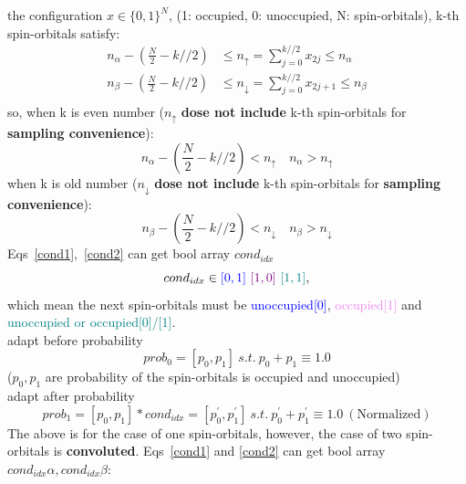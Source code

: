 the configuration $x \in \{0, 1\}^{N}$, (1: occupied, 0: unoccupied, N: spin-orbitals),
k-th spin-orbitals satisfy:
\begin{equation}
    \begin{split}
        n_{\alpha} - \left(\frac{N}{2} - k//2\right) &
            \leq n_{\uparrow} = \sum_{j=0}^{k//2}x_{2j} \leq n_{\alpha} \\
        n_{\beta} - \left(\frac{N}{2} - k//2\right) &
            \leq n_{\downarrow} = \sum_{j=0}^{k//2}x_{2j+1} \leq n_{\beta} \\
    \end{split}
\end{equation}
so, when k is even number ($n_{\uparrow}$ \textbf{dose not include} k-th spin-orbitals for \textbf{sampling convenience}):
\begin{equation}
    n_{\alpha} - \left(\frac{N}{2} - k//2\right) < n_{\uparrow} \quad n_{\alpha} > n_{\uparrow} \label{cond1}
\end{equation}
when k is old number  ($n_{\downarrow}$ \textbf{dose not include} k-th spin-orbitals for \textbf{sampling convenience}):
\begin{equation}
    n_{\beta} - \left(\frac{N}{2} - k//2\right) < n_{\downarrow} \quad n_{\beta} > n_{\downarrow} \label{cond2}
\end{equation}
Eqs\ \ref{cond1},\ \ref{cond2} can get bool array $cond_{idx}$
\begin{equation}
 cond_{idx} \in \textcolor{blue}{[0, 1]} \ \textcolor{violet}{[1, 0]}\ \textcolor{teal}{[1, 1]},
\end{equation}
which mean the next spin-orbitals must be \textcolor{blue}{unoccupied[0]},
\textcolor{violet}{occupied[1]} and \textcolor{teal}{unoccupied or occupied[0]/[1]}.\\
adapt before probability 
\begin{equation}
    prob_0 = [p_0, p_1] \ s.t.\ p_0 + p_1 \equiv 1.0
\end{equation}
($p_0, p_1$ are probability of the spin-orbitals is occupied and unoccupied)\\
adapt after probability
\begin{equation}
prob_1 =[p_0, p_1] * cond_{idx} = [p_0^{\prime}, p_1^{\prime}] 
    \ s.t.\ p_0^{\prime} + p_1^{\prime} \equiv 1.0 \ (\textrm{Normalized})
\end{equation}
\indent The above is for the case of one spin-orbitals, however, 
the case of two spin-orbitals is \textbf{convoluted}.
Eqs\ \ref{cond1} and \ref{cond2} can get bool array $cond_{idx}\alpha, cond_{idx}\beta$:

